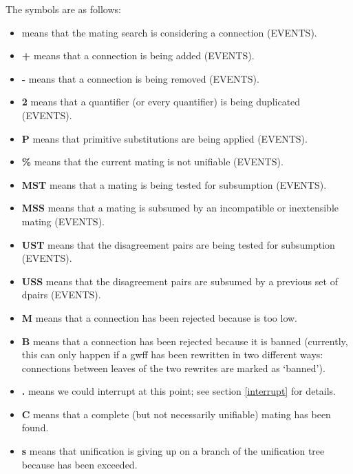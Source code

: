 The symbols are as follows:
\begin{itemize}
\item {\bf *} means that the mating search is considering a connection (EVENTS).

\item {\bf +} means that a connection is being added (EVENTS).

\item {\bf -} means that a connection is being removed (EVENTS).

\item {\bf 2} means that a quantifier (or every quantifier) is being duplicated (EVENTS).

\item {\bf P} means that primitive substitutions are being applied (EVENTS).

\item {\bf \%} means that the current mating is not unifiable (EVENTS).

\item {\bf MST} means that a mating is being tested for subsumption (EVENTS).

\item {\bf MSS} means that a mating is subsumed by an incompatible or inextensible mating (EVENTS).

\item {\bf UST} means that the disagreement pairs are being tested for subsumption (EVENTS).

\item {\bf USS} means that the disagreement pairs are subsumed by a previous set of dpairs (EVENTS).

\item {\bf M} means that a connection has been rejected because  is too low.

\item {\bf B} means that a connection has been rejected because it is banned (currently, this can only happen
if a gwff has been rewritten in two different ways: connections between leaves of the two rewrites are
marked as `banned').

\item {\bf .} means we could interrupt at this point; see section \ref{interrupt} for details.

\item {\bf C} means that a complete (but not necessarily unifiable) mating has been found.

\item {\bf s} means that unification is giving up on a branch of the unification tree because
 has been exceeded.


\end{itemize}
